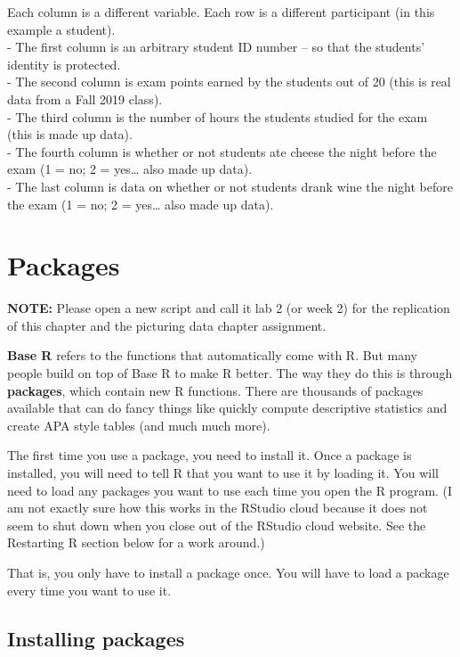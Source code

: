\documentclass[
]{book}
\begin{document}
Each column is a different variable. Each row is a different participant (in this example a student).\\
- The first column is an arbitrary student ID number -- so that the students' identity is protected.\\
- The second column is exam points earned by the students out of 20 (this is real data from a Fall 2019 class).\\
- The third column is the number of hours the students studied for the exam (this is made up data).\\
- The fourth column is whether or not students ate cheese the night before the exam (1 = no; 2 = yes\ldots{} also made up data).\\
- The last column is data on whether or not students drank wine the night before the exam (1 = no; 2 = yes\ldots{} also made up data).

\hypertarget{packages}{%
\chapter{Packages}\label{packages}}

\textbf{NOTE:} Please open a new script and call it lab 2 (or week 2) for the replication of this chapter and the picturing data chapter assignment.

\textbf{Base R} refers to the functions that automatically come with R. But many people build on top of Base R to make R better. The way they do this is through \textbf{packages}, which contain new R functions. There are thousands of packages available that can do fancy things like quickly compute descriptive statistics and create APA style tables (and much much more).

The first time you use a package, you need to install it. Once a package is installed, you will need to tell R that you want to use it by loading it. You will need to load any packages you want to use each time you open the R program. (I am not exactly sure how this works in the RStudio cloud because it does not seem to shut down when you close out of the RStudio cloud website. See the Restarting R section below for a work around.)

That is, you only have to install a package once. You will have to load a package every time you want to use it.

\hypertarget{installing-packages}{%
\section{Installing packages}\label{installing-packages}}
\end{document}
